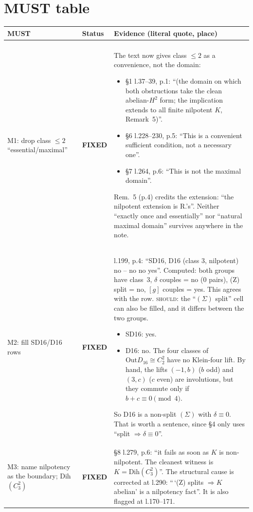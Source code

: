 \documentclass[10pt]{article}
\newcommand{\iss}[1]{\textsc{#1}}
\newcommand{\Out}{\mathrm{Out}}
\newcommand{\st}[1]{\textbf{#1}}
\begin{document}
\section{MUST table}
\small
\begin{longtable}{>{\raggedright}p{2.3cm}>{\raggedright}p{1.4cm}p{12.6cm}}
\toprule
MUST & Status & Evidence (literal quote, place)\\
\midrule
\multicolumn{3}{l}{\emph{Two gerbe ends (UID 386)}}\\
M1: drop class $\le2$ ``essential/maximal'' & \st{FIXED} &
  The text now gives class $\le2$ as a convenience, not the domain:
  \begin{itemize}
  \item \S1 l.37--39, p.1: ``(the domain on which both obstructions take the clean abelian-$H^2$ form; the implication extends to all finite nilpotent $K$, Remark~5)''.
  \item \S6 l.228--230, p.5: ``This is a convenient sufficient condition, not a necessary one''.
  \item \S7 l.264, p.6: ``This is not the maximal domain''.
  \end{itemize}
  Rem.~5 (p.4) credits the extension: ``the nilpotent extension is R.'s''. Neither ``exactly once and essentially'' nor ``natural maximal domain'' survives anywhere in the note.\\
M2: fill SD16/D16 rows & \st{FIXED} &
  l.199, p.4: ``SD16, D16 (class 3, nilpotent) \quad no \quad -- \quad no \quad no \quad yes''.
  Computed: both groups have class~3, $\delta$ couples = no (0 pairs), (Z) split = no, $[g]$ couples = yes. This agrees with the row.
  \iss{should}: the ``$(\Sigma)$ split'' cell can also be filled, and it differs between the two groups.
  \begin{itemize}
  \item SD16: yes.
  \item D16: no. The four classes of $\Out D_{16}\cong C_2^2$ have no Klein-four lift. By hand, the lifts $(-1,b)$ ($b$ odd) and $(3,c)$ ($c$ even) are involutions, but they commute only if $b+c\equiv0\pmod 4$.
  \end{itemize}
  So D16 is a non-split $(\Sigma)$ with $\delta\equiv0$. That is worth a sentence, since \S4 only uses ``split $\Rightarrow\delta\equiv0$''.\\
M3: name nilpotency as the boundary; Dih$(C_3^2)$ & \st{FIXED} &
  \S8 l.279, p.6: ``it fails as soon as $K$ is non-nilpotent. The cleanest witness is $K=\mathrm{Dih}(C_3^2)$''.
  The structural cause is corrected at l.290: ``\,`(Z) splits $\Rightarrow K$ abelian' is a nilpotency fact''. It is also flagged at l.170--171.

\end{longtable}
\end{document}
